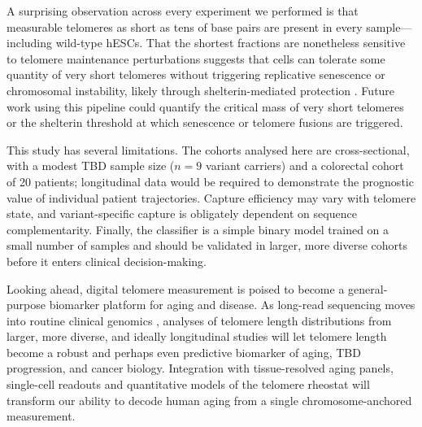 \documentclass[11pt]{article}
\begin{document}
A surprising observation across every experiment we performed is that
measurable telomeres as short as tens of base pairs are present in
every sample---including wild-type hESCs. That the shortest fractions
are nonetheless sensitive to telomere maintenance perturbations
suggests that cells can tolerate some quantity of very short telomeres
without triggering replicative senescence or chromosomal instability,
likely through shelterin-mediated protection
\citep{palm2008howshelterin}. Future work using this pipeline could
quantify the critical mass of very short telomeres or the shelterin
threshold at which senescence or telomere fusions are triggered.

This study has several limitations. The cohorts analysed here are
cross-sectional, with a modest TBD sample size ($n{=}9$ variant
carriers) and a colorectal cohort of 20 patients; longitudinal data
would be required to demonstrate the prognostic value of individual
patient trajectories. Capture efficiency may vary with telomere state,
and variant-specific capture is obligately dependent on sequence
complementarity. Finally, the classifier is a simple binary model
trained on a small number of samples and should be validated in larger,
more diverse cohorts before it enters clinical decision-making.

Looking ahead, digital telomere measurement is poised to become a
general-purpose biomarker platform for aging and disease. As long-read
sequencing moves into routine clinical genomics
\citep{nurk2022complete}, analyses of telomere length distributions
from larger, more diverse, and ideally longitudinal studies will let
telomere length become a robust and perhaps even predictive biomarker
of aging, TBD progression, and cancer biology. Integration with
tissue-resolved aging panels, single-cell readouts and quantitative
models of the telomere rheostat will transform our ability to decode
human aging from a single chromosome-anchored measurement.



\end{document}
